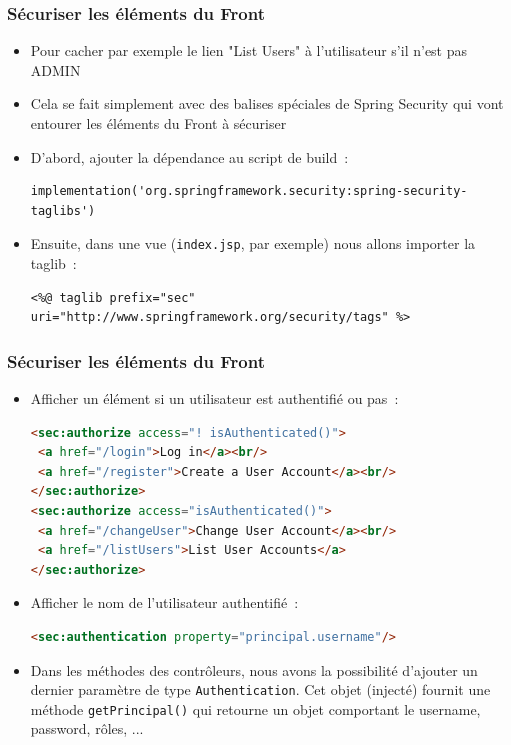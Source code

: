 \documentclass{beamer}
\begin{document}
\begin{frame}[fragile]
	\frametitle{Sécuriser les éléments du Front}
	\begin{itemize}
		\item Pour cacher par exemple le lien "List Users" à l'utilisateur s'il n'est pas ADMIN
		\item Cela se fait simplement avec des balises spéciales de Spring Security qui vont entourer les éléments du Front à sécuriser
		\item D'abord, ajouter la dépendance au script de build~:
\begin{lstlisting}
implementation('org.springframework.security:spring-security-taglibs')
\end{lstlisting}
\item Ensuite, dans une vue (\texttt{index.jsp}, par exemple) nous allons importer la taglib~:
\begin{lstlisting}
<%@ taglib prefix="sec" uri="http://www.springframework.org/security/tags" %>
\end{lstlisting}
	\end{itemize}
\end{frame}

\begin{frame}[fragile]
	\frametitle{Sécuriser les éléments du Front}
	\begin{itemize}
		\item Afficher un élément si un utilisateur est authentifié ou pas~:
\begin{lstlisting}[language=Html]
<sec:authorize access="! isAuthenticated()">
 <a href="/login">Log in</a><br/>
 <a href="/register">Create a User Account</a><br/>
</sec:authorize>
<sec:authorize access="isAuthenticated()">
 <a href="/changeUser">Change User Account</a><br/>
 <a href="/listUsers">List User Accounts</a>
</sec:authorize>
\end{lstlisting}
\item Afficher le nom de l'utilisateur authentifié~:
\begin{lstlisting}[language=Html]
<sec:authentication property="principal.username"/>
\end{lstlisting}
\item Dans les méthodes des contrôleurs, nous avons la possibilité d'ajouter un dernier paramètre de type \texttt{Authentication}. Cet objet (injecté) fournit une méthode \texttt{getPrincipal()} qui retourne un objet comportant le username, password, rôles, ...
	\end{itemize}
\end{frame}
\end{document}
